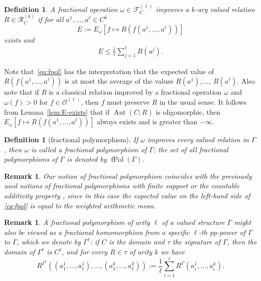 \documentclass[nonacm]{acmart}
\DeclareMathOperator{\Aut}{Aut}
\DeclareMathOperator{\fPol}{fPol}
\newtheorem{definition}[theorem]{Definition}
\newtheorem{remark}[theorem]{Remark}
\begin{document}
\begin{definition}\label{def:pres}
A fractional operation $\omega \in {\mathscr F}_C^{(\ell)}$ \emph{improves}
a $k$-ary valued relation $R \in {\mathscr R}^{(k)}_C$ if for all $a^1,\dots,a^{\ell} \in C^k$ 
$$E := E_\omega[f \mapsto R(f(a^1,\dots,a^{\ell}))]$$ 
exists and 
\begin{align}
E \leq
\frac{1}{\ell} \sum_{j = 1}^{\ell} R(a^j). \label{eq:fpol}
\end{align}
\end{definition}

Note that~\eqref{eq:fpol} has the interpretation that 
the expected value of $R(f(a^1,\dots,a^\ell))$ is at most the average of the values $R(a^1),\dots$, $R(a^\ell)$. 
Also note that if $R$ is a classical relation improved by a fractional operation $\omega$
and $\omega(f) > 0$ for $f \in {\mathscr O}^{(\ell)}$, then $f$ must preserve $R$ in the usual sense.
It follows from Lemma~\ref{lem:E-exists} that if $\Aut(C; R)$ is oligomorphic, then $E_\omega[f \mapsto R(f(a^1, \dots, a^{\ell}))]$ always exists and is greater than $-\infty$.

\begin{definition}[fractional polymorphism]
If $\omega$ improves every valued relation in $\Gamma$, 
then $\omega$ is called a \emph{fractional polymorphism 
of $\Gamma$}; the set of all fractional polymorphisms of $\Gamma$ is denoted by $\fPol(\Gamma)$.
\end{definition}

\begin{remark}
   Our notion of fractional polymorphism coincides with the previously used notions of fractional polymorphisms with finite support \cite{SchneiderViola, ViolaThesis} or the countable additivity property \cite{ViolaZivny}, since in this case the expected value on the left-hand side of \eqref{eq:fpol} is equal to the weighted arithmetic mean.
\end{remark}

 \begin{remark}\label{rem:frac-pol-frac-hom}
A fractional polymorphism of arity $\ell$ of a valued structure $\Gamma$ might also be viewed as a fractional homomorphism from a specific $\ell$-th pp-power of $\Gamma$ to $\Gamma$, which we denote by $\Gamma^{\ell}$: 
if $C$ is the domain and $\tau$ the signature of $\Gamma$, 
then the domain of $\Gamma^{\ell}$ is $C^{\ell}$,
and for every $R \in \tau$ of arity $k$ we have
$$R^{\Gamma^{\ell}}((a^1_1,\dots,a^1_{\ell}),\dots,(a^k_1,\dots,a^k_{\ell})) 
:= \frac{1}{\ell} \sum_{i=1}^\ell R^{\Gamma}(a^1_i,\dots,a^{k}_i).$$
\end{remark} 
\end{document}
